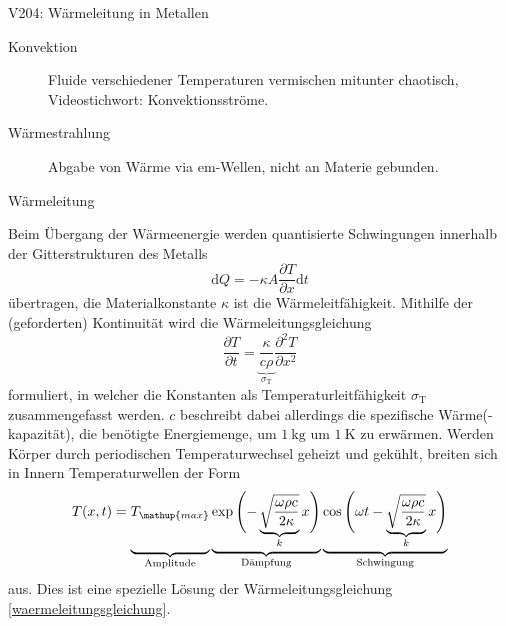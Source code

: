 \begin{Versuch}{V204: Wärmeleitung in Metallen}
\begin{Theorie}
            \begin{center}
            \begin{description}
            	\item [Konvektion] Fluide verschiedener Temperaturen vermischen mitunter chaotisch, Videostichwort: Konvektionsströme.
            	\item [Wärmestrahlung] Abgabe von Wärme via em-Wellen, nicht an Materie gebunden.
            	\item [Wärmeleitung]
            \end{description}
            \end{center}
            Beim Übergang der Wärmeenergie werden quantisierte Schwingungen innerhalb der Gitterstrukturen des Metalls
            \begin{equation}
				\label{waermemenge}
				\mathup{d}Q=-\kappa A\frac{\partial{T}}{\partial{x}}\mathup{d}t
			\end{equation}
			übertragen, die Materialkonstante $\kappa$ ist die Wärmeleitfähigkeit.
			Mithilfe der (geforderten) Kontinuität wird die Wärmeleitungsgleichung 
			\begin{equation}
				\label{waermeleitungsgleichung}
				\frac{\partial{T}}{\partial{t}} =  \underbrace{\frac{\kappa}{c\rho}}_{\sigma_\text{T}}\frac{\partial^2{T}}{\partial{x^2}}
			\end{equation}
			formuliert, in welcher die Konstanten
			als Temperaturleitfähigkeit $\sigma_\mathup{T}$ zusammengefasst werden.
			$c$ beschreibt dabei allerdings die spezifische Wärme(-kapazität), 
			die benötigte Energiemenge, 
			um $\SI{1}{\kilo\gram}$ um $\SI{1}{\kelvin}$ zu erwärmen.
			Werden Körper durch periodischen Temperaturwechsel geheizt und gekühlt, breiten sich in Innern Temperaturwellen der Form
			\begin{equation}
				\label{temperaturwelle}
				T(x,t)= \underbrace{\vphantom{\underbrace{\biggl(\biggr)}_{k}}T_\mathup{max}}_{\text{Amplitude}} \underbrace{\exp{\Biggl(-\underbrace{\sqrt{\frac{\omega \rho c}{2\kappa}}}_{k}x\Biggr)}}_{\text{Dämpfung}} \underbrace{\cos{\Biggl(\omega t - \underbrace{\sqrt{\frac{\omega \rho c}{2\kappa}}}_{k}x\Biggr)}}_{\text{Schwingung}}
			\end{equation}
			aus.
			Dies ist eine spezielle Lösung der Wärmeleitungsgleichung \eqref{waermeleitungsgleichung}.


\end{Theorie}
\end{Versuch}
